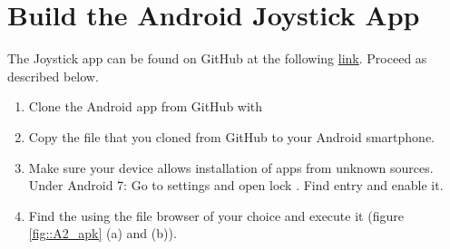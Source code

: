 \section{Build the Android Joystick App}
\label{sec::A2_aa}
The Joystick app can be found on GitHub at the following \href{https://github.com/mhubii/ijoy}{link}. Proceed as described below.
\begin{enumerate}
	\item Clone the Android app from GitHub with
	\newline {}
	\item Copy the  file that you cloned from GitHub to your Android smartphone.
	\item Make sure your device allows installation of apps from unknown sources. Under Android 7:
	\subitem Go to settings and open lock .
	\subitem Find entry  and enable it.
	\item Find the  using the file browser of your choice and execute it (figure \ref{fig::A2_apk} (a) and (b)).
	\begin{figure}[h]
		\centering

\end{figure}
\end{enumerate}
